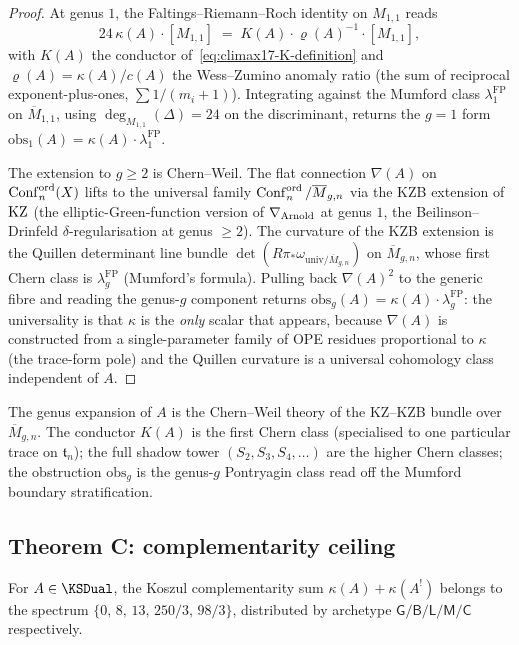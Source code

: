 \begin{proof}
At genus $1$, the Faltings--Riemann--Roch identity on $M_{1,1}$ reads
\[
  24\,\kappa(A)\cdot[M_{1,1}]\;=\;K(A)\cdot\varrho(A)^{-1}\cdot[M_{1,1}],
\]
with $K(A)$ the conductor of~\eqref{eq:climax17-K-definition} and
$\varrho(A)=\kappa(A)/c(A)$ the Wess--Zumino anomaly ratio (the sum
of reciprocal exponent-plus-ones, $\sum 1/(m_i+1)$). Integrating
against the Mumford class $\lambda_1^{\mathrm{FP}}$ on
$\overline{M}_{1,1}$, using $\deg_{M_{1,1}}(\Delta)=24$ on the
discriminant, returns the $g=1$ form
$\mathrm{obs}_1(A)=\kappa(A)\cdot\lambda_1^{\mathrm{FP}}$.

The extension to $g\geq 2$ is Chern--Weil. The flat connection
$\nabla(A)$ on $\operatorname{Conf}_n^{\mathrm{ord}}(X)$ lifts to the universal family
$\operatorname{Conf}_n^{\mathrm{ord}}/\overline{M}_{g,n}$ via the KZB extension of
$\mathrm{KZ}$ (the elliptic-Green-function version of $\nabla_{\mathrm{Arnold}}$ at genus $1$,
the Beilinson--Drinfeld $\delta$-regularisation at genus $\geq 2$).
The curvature of the KZB extension is the Quillen determinant
line bundle $\det(R\pi_*\omega_{\mathrm{univ}/\overline{M}_{g,n}})$ on
$\overline{M}_{g,n}$, whose first Chern class is $\lambda_g^{\mathrm{FP}}$
(Mumford's formula). Pulling back $\nabla(A)^2$ to the generic fibre
and reading the genus-$g$ component returns
$\mathrm{obs}_g(A)=\kappa(A)\cdot\lambda_g^{\mathrm{FP}}$: the
universality is that $\kappa$ is the \emph{only} scalar that appears,
because $\nabla(A)$ is constructed from a single-parameter family of
OPE residues proportional to $\kappa$ (the trace-form pole) and the
Quillen curvature is a universal cohomology class independent of $A$.
\end{proof}

\begin{remark}
\label{rem:climax17-chern-weil}
The genus expansion of $A$ is the Chern--Weil theory of the KZ--KZB
bundle over $\overline{M}_{g,n}$. The conductor $K(A)$ is the first
Chern class (specialised to one particular trace on $\mathfrak{t}_n$);
the full shadow tower $(S_2,S_3,S_4,\ldots)$ are the higher Chern
classes; the obstruction $\mathrm{obs}_g$ is the genus-$g$
Pontryagin class read off the Mumford boundary stratification.
\end{remark}

\subsection{Theorem C: complementarity ceiling}

\begin{corollary}[Theorem C]
\label{cor:climax17-theoremC-from-climax}
\ClaimStatusProvedHere
For $A\in\KSDual$, the Koszul complementarity sum
$\kappa(A)+\kappa(A^!)$ belongs to the spectrum
$\{0,\,8,\,13,\,250/3,\,98/3\}$, distributed by archetype
$\mathsf{G}/\mathsf{B}/\mathsf{L}/\mathsf{M}/\mathsf{C}$ respectively.
\end{corollary}

